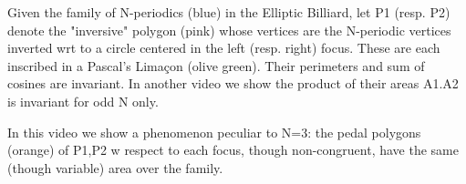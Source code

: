 Given the family of N-periodics (blue) in the Elliptic Billiard, let P1 (resp. P2) denote the "inversive" polygon (pink) whose vertices are the N-periodic vertices inverted wrt to a circle centered in the left (resp. right) focus. These are each inscribed in a Pascal's Limaçon (olive green). Their perimeters and sum of cosines are invariant. In another video we show the product of their areas A1.A2  is invariant for odd N only.

In this video we show a phenomenon peculiar to N=3: the pedal polygons (orange) of P1,P2 w respect to each focus, though non-congruent, have the same (though variable) area over the family.